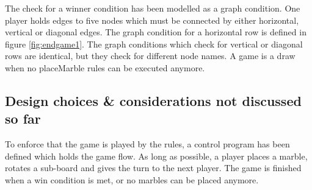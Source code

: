 The check for a winner condition has been modelled as a graph condition.
One player holds edges to five nodes which must be connected by either horizontal, vertical or diagonal edges.
The graph condition for a horizontal row is defined in figure \ref{fig:endgame1}.
The graph conditions which check for vertical or diagonal rows are identical, but they check for different node names.
A game is a draw when no placeMarble rules can be executed anymore.

\subsection{Design choices \& considerations not discussed so far}
To enforce that the game is played by the rules, a control program has been defined which holds the game flow.
As long as possible, a player places a marble, rotates a sub-board and gives the turn to the next player.
The game is finished when a win condition is met, or no marbles can be placed anymore.